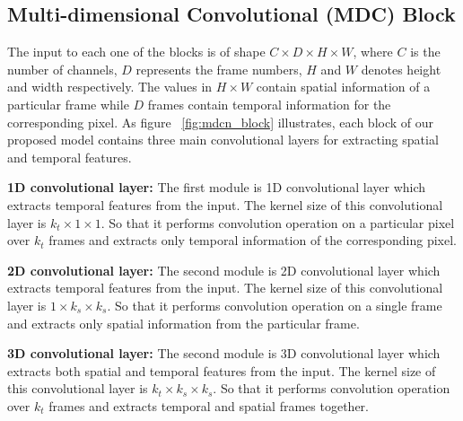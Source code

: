 

    
    \subsection{Multi-dimensional Convolutional (MDC) Block}
	The input to each one of the blocks is of shape $ {C}\times{D}\times{H}\times{W} $, where ${C}$ is the number of channels, ${D}$ represents the frame numbers, ${H}$ and ${W}$ denotes height and width respectively. 
	The values in $ {H}\times{W} $ contain spatial information of a particular frame while $ {D} $ frames contain temporal information for the corresponding pixel.
	As figure ~\ref{fig:mdcn_block} illustrates, each block of our proposed model contains three main convolutional layers for extracting spatial and temporal features.
    
    \textbf{ 1D convolutional layer:} The first module is 1D convolutional layer which extracts temporal features from the input.
    The kernel size of this convolutional layer is $ {{k}_{t}}\times{1}\times{1} $. 
    So that it performs convolution operation on a particular pixel over $ {{k}_{t}} $ frames and extracts only temporal information of the corresponding pixel.
    
    \textbf{ 2D convolutional layer:} The second module is 2D convolutional layer which extracts temporal features from the input.
    The kernel size of this convolutional layer is $ {1}\times{{k}_{s}}\times{{k}_{s}} $. 
    So that it performs convolution operation on a single frame and extracts only spatial information from the particular frame.
    
   \textbf{ 3D convolutional layer:} The second module is 3D convolutional layer which extracts both spatial and temporal features from the input.
    The kernel size of this convolutional layer is $ {{k}_{t}}\times{{k}_{s}}\times{{k}_{s}} $. 
    So that it performs convolution operation over ${{k}_{t}}$ frames and extracts temporal and spatial frames together.
    
